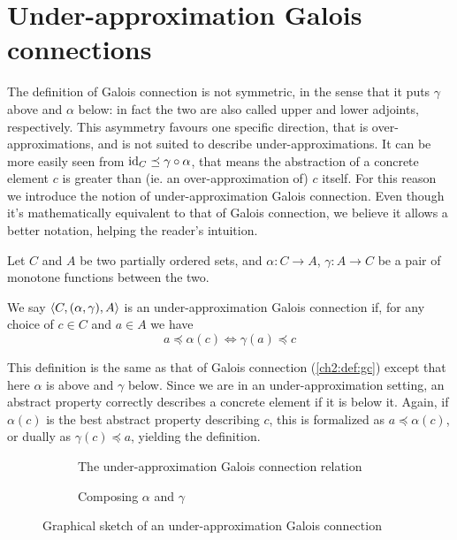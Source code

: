 \section{Under-approximation Galois connections}
The definition of Galois connection is not symmetric, in the sense that it puts $\gamma$ above and $\alpha$ below: in fact the two are also called upper and lower adjoints, respectively. This asymmetry favours one specific direction, that is over-approximations, and is not suited to describe under-approximations. It can be more easily seen from $\text{id}_C \preceq \gamma \circ \alpha$, that means the abstraction of a concrete element $c$ is greater than (ie. an over-approximation of) $c$ itself.
For this reason we introduce the notion of under-approximation Galois connection. Even though it's mathematically equivalent to that of Galois connection, we believe it allows a better notation, helping the reader's intuition.
\begin{definition}\label{ch2:def:under-gc}
	Let $C$ and $A$ be two partially ordered sets, and $\alpha : C \rightarrow A$, $\gamma : A \rightarrow C$ be a pair of monotone functions between the two.

	We say $\langle C, (\alpha, \gamma), A \rangle$ is an under-approximation Galois connection if, for any choice of $c \in C$ and $a \in A$ we have
	\[
	a \preceq \alpha(c) \iff \gamma(a) \preceq c
	\]
\end{definition}
This definition is the same as that of Galois connection (\ref{ch2:def:gc}) except that here $\alpha$ is above and $\gamma$ below. Since we are in an under-approximation setting, an abstract property correctly describes a concrete element if it is below it. Again, if $\alpha(c)$ is the best abstract property describing $c$, this is formalized as $a \preceq \alpha(c)$, or dually as $\gamma(c) \preceq a$, yielding the definition.
\begin{figure}[ht]
	\centering
	\begin{subfigure}{.5\textwidth}
		\centering
		{
			\selectfont
			\def\svgwidth{.8\textwidth}
			
		}
		\caption{The under-approximation Galois connection relation}
		\label{ch2:fig:ugc-sketch:relation}
	\end{subfigure}%
	\begin{subfigure}{.5\textwidth}
		\centering
		{
			\selectfont
			\def\svgwidth{.8\textwidth}
			
		}
		\caption{Composing $\alpha$ and $\gamma$}
		\label{ch2:fig:ugc-sketch:gamma-alpha-c}
	\end{subfigure}
	\caption{Graphical sketch of an under-approximation Galois connection}
	\label{ch2:fig:ugc-sketch}
\end{figure}

